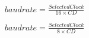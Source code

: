 \documentclass{article}
\begin{document}
$ baudrate = \frac{Selected Clock}{16 \times CD} $
\pagebreak

$ baudrate = \frac{Selected Clock}{8 \times CD} $
\pagebreak
\end{document}
